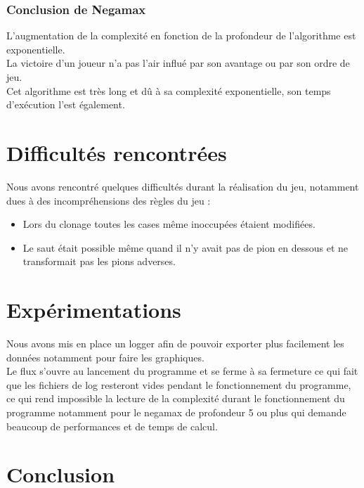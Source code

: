 \documentclass[12pt]{article}
\begin{document}
\subsubsection{Conclusion de Negamax}

L’augmentation de la complexité en fonction de la profondeur de l’algorithme est exponentielle.\\
La victoire d’un joueur n’a pas l’air influé par son avantage ou par son ordre de jeu.\\
Cet algorithme est très long et dû à sa complexité exponentielle, son temps d’exécution l’est également.

\section{Difficultés rencontrées}

Nous avons rencontré quelques difficultés durant la réalisation du jeu, notamment dues à des incompréhensions des règles du jeu :\\

\begin{itemize}
    \item Lors du clonage toutes les cases même inoccupées étaient modifiées.
    \item Le saut était possible même quand il n'y avait pas de pion en dessous et ne transformait pas les pions adverses.
\end{itemize}

\section{Expérimentations}

Nous avons mis en place un logger afin de pouvoir exporter plus facilement les données notamment pour faire les graphiques.\\

Le flux s'ouvre au lancement du programme et se ferme à sa fermeture ce qui fait que les fichiers de log resteront vides pendant le fonctionnement du programme, ce qui rend impossible la lecture de la complexité durant le fonctionnement du programme notamment pour le negamax de profondeur 5 ou plus qui demande beaucoup de performances et de temps de calcul.


\section{Conclusion}
\end{document}
